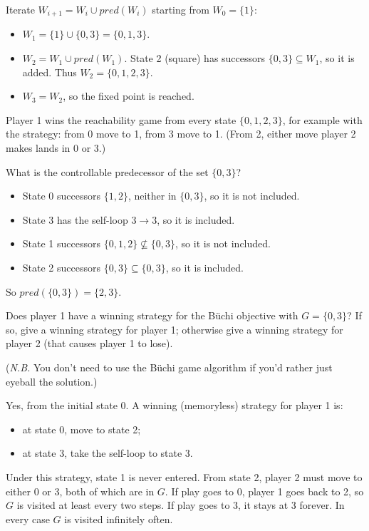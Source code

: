 \documentclass[11pt]{article}
\begin{document}
\begin{qunlist}
\begin{qparts}
    \begin{answer}
      Iterate $W_{i+1} = W_i \cup pred(W_i)$ starting from $W_0 = \{1\}$:
      \begin{itemize}
        \item $W_1 = \{1\} \cup \{0,3\} = \{0,1,3\}$.
        \item $W_2 = W_1 \cup pred(W_1)$. State 2 (square) has successors $\{0,3\} \subseteq W_1$, so it is added. Thus $W_2 = \{0,1,2,3\}$.
        \item $W_3 = W_2$, so the fixed point is reached.
      \end{itemize}
      Player 1 wins the reachability game from every state $\{0,1,2,3\}$, for example with the strategy: from 0 move to 1, from 3 move to 1. (From 2, either move player 2 makes lands in 0 or 3.)
    \end{answer}

  \item
    What is the controllable predecessor of the set $\{0, 3\}$?

    \begin{answer}
      \begin{itemize}
        \item State 0 successors $\{1,2\}$, neither in $\{0,3\}$, so it is not included.
        \item State 3 has the self-loop $3 \to 3$, so it is included.
        \item State 1 successors $\{0,1,2\} \not\subseteq \{0,3\}$, so it is not included.
        \item State 2 successors $\{0,3\} \subseteq \{0,3\}$, so it is included.
      \end{itemize}
      So $pred(\{0,3\}) = \{2, 3\}$.
    \end{answer}

  \item
    Does player 1 have a winning strategy for the B\"uchi objective with $G = \{0, 3\}$?
    If so, give a winning strategy for player 1; otherwise give a winning strategy for player 2 (that causes player 1 to lose).

    (\emph{N.B.} You don't need to use the B\"uchi game algorithm if you'd rather just eyeball the solution.)

    \begin{answer}
      Yes, from the initial state 0. A winning (memoryless) strategy for player 1 is:
      \begin{itemize}
        \item at state 0, move to state 2;
        \item at state 3, take the self-loop to state 3.
      \end{itemize}
      Under this strategy, state 1 is never entered. From state 2, player 2 must move to either 0 or 3, both of which are in $G$. If play goes to 0, player 1 goes back to 2, so $G$ is visited at least every two steps. If play goes to 3, it stays at 3 forever. In every case $G$ is visited infinitely often.


\end{answer}
\end{qparts}
\end{qunlist}
\end{document}
